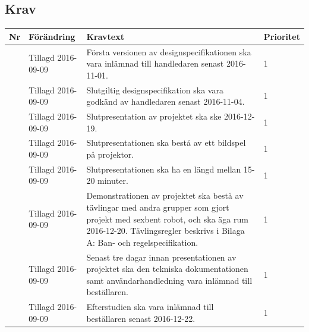 \documentclass[a4paper,titlepage,12pt]{article}
\newcounter{reqNr}
\newcommand{\nextReqNr}{\stepcounter{reqNr}\arabic{reqNr}}
\begin{document}
	\subsection{Krav}
	\begin{table}[h]
		\label{tab:Krav leverans}
		\begin{tabularx}{\textwidth}{|c|l|X|l|}
			\hline
			\textbf{Nr} & \textbf{Förändring} & \textbf{Kravtext} & \textbf{Prioritet} 
				\\ \hline

			\nextReqNr & Tillagd 2016-09-09 & Första versionen av
                designspecifikationen ska vara inlämnad till handledaren senast
                2016-11-01. & 1
				\\ \hline

			\nextReqNr & Tillagd 2016-09-09 & Slutgiltig designspecifikation
                ska vara godkänd av handledaren senast 2016-11-04. & 1
				\\ \hline
                
			\nextReqNr & Tillagd 2016-09-09 & Slutpresentation av projektet ska
            ske 2016-12-19. & 1
				\\ \hline

			\nextReqNr & Tillagd 2016-09-09 & Slutpresentationen ska bestå av
            ett bildspel på projektor. & 1
				\\ \hline

			\nextReqNr & Tillagd 2016-09-09 & Slutpresentationen ska ha en
            längd mellan 15-20 minuter. & 1
				\\ \hline

			\nextReqNr & Tillagd 2016-09-09 & Demonstrationen av projektet ska
            bestå av tävlingar med andra grupper som gjort projekt med sexbent
            robot, och ska äga rum 2016-12-20. Tävlingsregler beskrivs i Bilaga
            A: Ban- och regelspecifikation. & 1
				\\ \hline

			\nextReqNr & Tillagd 2016-09-09 & Senast tre dagar innan
                presentationen av projektet ska den tekniska dokumentationen
                samt användarhandledning vara inlämnad till beställaren. & 1
				\\ \hline

			\nextReqNr & Tillagd 2016-09-09 & Efterstudien ska vara inlämnad
            till beställaren senast 2016-12-22. & 1
				\\ \hline

		\end{tabularx}
	\end{table}
	
\end{document}
